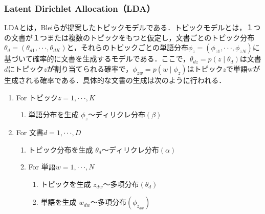 \documentclass[a4paper,11pt,oneside,openany]{jsbook}
\begin{document}
		\subsubsection{Latent Dirichlet Allocation（LDA）}
LDA\cite{Blei}とは，Bleiらが提案したトピックモデルである．トピックモデルとは，１つの文書が１つまたは複数のトピックをもつと仮定し，文書ごとのトピック分布$\theta_{d} = (\theta_{d1},\cdot\cdot\cdot,\theta_{dK})$と，それらのトピックごとの単語分布$\phi_{z} = (\phi_{z1},\cdot\cdot\cdot,\phi_{zN})$に基づいて確率的に文書を生成するモデルである．ここで，$\theta_{dz} = p(z\mid\theta_{d})$は文書$d$にトピック$z$が割り当てられる確率で，$\phi_{zw} = p(w\mid\phi_{z})$はトピック$z$で単語wが生成される確率である．具体的な文書の生成は次のように行われる．
\begin{enumerate}
\item For トピック$z = 1, \cdot\cdot\cdot , K$
	\begin{enumerate}
	\setlength{\itemindent}{2cm}
 	\item 単語分布を生成 $\phi_{z} 〜 ディリクレ分布(\beta)$
	\end{enumerate}
\item For 文書$d = 1,\cdot\cdot\cdot,D$
	\begin{enumerate}
	\setlength{\itemindent}{2cm}
 	\item トピック分布を生成 $\theta_{d} 〜 ディリクレ分布(\alpha)$
	\setlength{\itemindent}{2cm}
 	\item For 単語$w = 1, \cdot\cdot\cdot ,N$
		\begin{enumerate}
		\setlength{\itemindent}{3cm}
		\item トピックを生成 $z_{dw} 〜 多項分布(\theta_{d})$
		\setlength{\itemindent}{3cm}
		\item 単語を生成 $w_{dw} 〜 多項分布(\phi_{z_{dw}})$
		\end{enumerate}
	\end{enumerate}


\end{enumerate}
\end{document}
